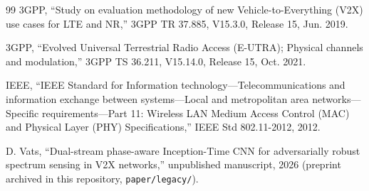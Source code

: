 \documentclass[review]{elsarticle}
\begin{document}
\begin{thebibliography}{99}
 3GPP, ``Study on evaluation methodology of new
Vehicle-to-Everything (V2X) use cases for LTE and NR,'' 3GPP TR 37.885,
V15.3.0, Release 15, Jun. 2019.

 3GPP, ``Evolved Universal Terrestrial Radio Access
(E-UTRA); Physical channels and modulation,'' 3GPP TS 36.211, V15.14.0,
Release 15, Oct. 2021.

 IEEE, ``IEEE Standard for Information
technology---Telecommunications and information exchange between
systems---Local and metropolitan area networks---Specific
requirements---Part 11: Wireless LAN Medium Access Control (MAC) and
Physical Layer (PHY) Specifications,'' IEEE Std 802.11-2012, 2012.

 D. Vats, ``Dual-stream phase-aware Inception-Time
CNN for adversarially robust spectrum sensing in V2X networks,''
unpublished manuscript, 2026 (preprint archived in this repository,
\texttt{paper/legacy/}).

\end{thebibliography}
\end{document}
